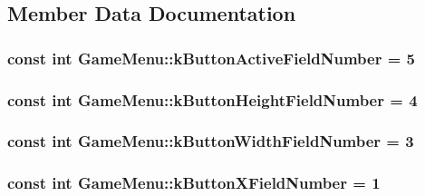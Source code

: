 \subsection{Member Data Documentation}
\hypertarget{class_game_menu_abf765ea4cffd8e765a7643700214676a}{
\subsubsection[{k\-Button\-Active\-Field\-Number}]{\setlength{\rightskip}{0pt plus 5cm}const int Game\-Menu\-::k\-Button\-Active\-Field\-Number = 5\hspace{0.3cm}{\ttfamily [static]}}}\label{class_game_menu_abf765ea4cffd8e765a7643700214676a}
\hypertarget{class_game_menu_aa4c6206a7f24f81750af4160e871d5ba}{
\subsubsection[{k\-Button\-Height\-Field\-Number}]{\setlength{\rightskip}{0pt plus 5cm}const int Game\-Menu\-::k\-Button\-Height\-Field\-Number = 4\hspace{0.3cm}{\ttfamily [static]}}}\label{class_game_menu_aa4c6206a7f24f81750af4160e871d5ba}
\hypertarget{class_game_menu_a9005124c7b657675f79d175b758bbfd3}{
\subsubsection[{k\-Button\-Width\-Field\-Number}]{\setlength{\rightskip}{0pt plus 5cm}const int Game\-Menu\-::k\-Button\-Width\-Field\-Number = 3\hspace{0.3cm}{\ttfamily [static]}}}\label{class_game_menu_a9005124c7b657675f79d175b758bbfd3}
\hypertarget{class_game_menu_abe2fdf1262f6916050a5bcca9222486a}{
\subsubsection[{k\-Button\-X\-Field\-Number}]{\setlength{\rightskip}{0pt plus 5cm}const int Game\-Menu\-::k\-Button\-X\-Field\-Number = 1\hspace{0.3cm}{\ttfamily [static]}}}\label{class_game_menu_abe2fdf1262f6916050a5bcca9222486a}

